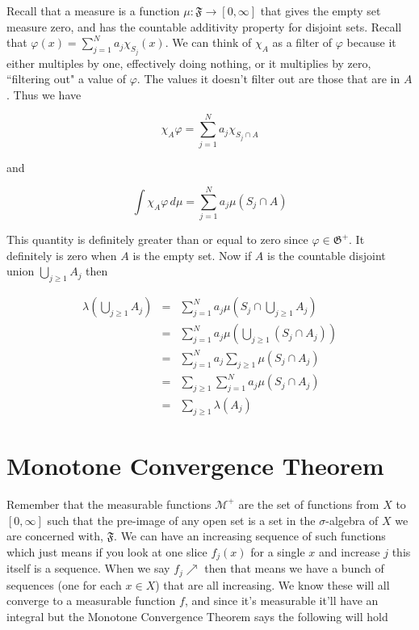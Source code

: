 \documentclass[oneside]{book}
\newenvironment{proof}[1][Proof]{\begin{trivlist}
\item[\hskip \labelsep {\bfseries #1}]}{\end{trivlist}}
\begin{document}
\begin{proof}
Recall that a measure is a function $\mu: \mathfrak{F} \to [0,\infty]$ that gives the empty set measure zero, and has the countable additivity property for disjoint sets. Recall that $\varphi(x)=\sum_{j=1}^N a_j \chi_{S_j}(x)$. We can think of $\chi_A$ as a filter of $\varphi$ because it either multiples by one, effectively doing nothing, or it multiplies by zero, ``filtering out" a value of $\varphi$. The values it doesn't filter out are those that are in $A$. Thus we have

\begin{equation}
\chi_A \varphi = \sum_{j=1}^N a_j \chi_{S_j \cap A}
\end{equation}
 
and

\begin{equation}
\int \chi_A \varphi\, d\mu = \sum_{j=1}^N a_j \mu(S_j \cap A)
\end{equation}
 
This quantity is definitely greater than or equal to zero since $\varphi \in \mathfrak{G}^+$. It definitely is zero when $A$ is the empty set. Now if $A$ is the countable disjoint union $\bigcup_{j \ge 1} A_j$ then

\begin{eqnarray}
\lambda \left( \bigcup_{j \ge 1} A_j \right) &=& \sum_{j=1}^N a_j \mu \left( S_j \cap \bigcup_{j \ge 1} A_j  \right) \nonumber \\
&=& \sum_{j=1}^N a_j \mu \left( \bigcup_{j \ge 1} (S_j \cap A_j)  \right) \nonumber \\
&=& \sum_{j=1}^N a_j \sum_{j \ge 1} \mu (S_j \cap A_j) \nonumber \\
&=&  \sum_{j \ge 1} \sum_{j=1}^N a_j \mu (S_j \cap A_j) \nonumber \\
&=&  \sum_{j \ge 1} \lambda(A_j)
\end{eqnarray}
 
\end{proof}

\section{Monotone Convergence Theorem}
Remember that the measurable functions $\mathcal{M}^+$ are the set of functions from $X$ to $[0,\infty]$ such that the pre-image of any open set is a set in the $\sigma$-algebra of $X$ we are concerned with, $\mathfrak{F}$. We can have an increasing sequence of such functions which just means if you look at one slice $f_j(x)$ for a single $x$ and increase $j$ this itself is a sequence. When we say $f_j \nearrow$ then that means we have a bunch of sequences (one for each $x \in X$) that are all increasing. We know these will all converge to a measurable function $f$, and since it's measurable it'll have an integral but the Monotone Convergence Theorem says the following will hold
\end{document}
